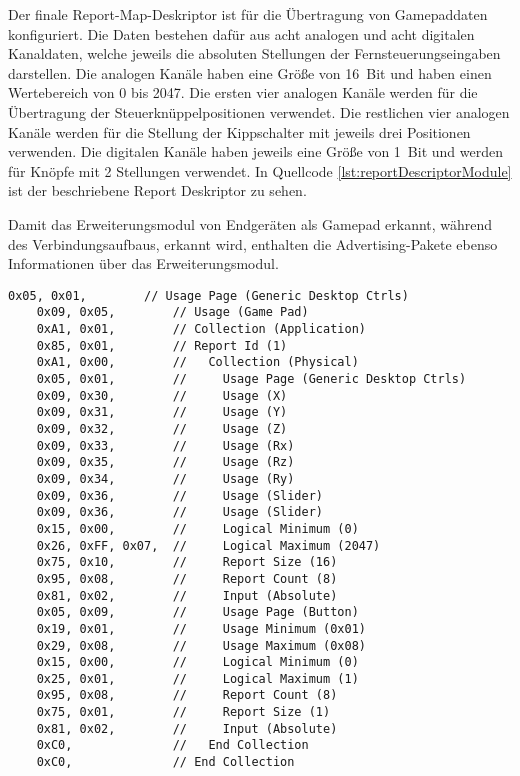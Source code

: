 Der finale Report-Map-Deskriptor ist für die Übertragung von Gamepaddaten konfiguriert. Die Daten bestehen dafür aus acht analogen und acht digitalen Kanaldaten, welche jeweils die absoluten Stellungen der Fernsteuerungseingaben darstellen. Die analogen Kanäle haben eine Größe von 16~Bit und haben einen Wertebereich von 0 bis 2047. Die ersten vier analogen Kanäle werden für die Übertragung der Steuerknüppelpositionen verwendet. Die restlichen vier analogen Kanäle werden für die Stellung der Kippschalter mit jeweils drei Positionen verwenden. Die digitalen Kanäle haben jeweils eine Größe von 1~Bit und werden für Knöpfe mit 2 Stellungen verwendet. In Quellcode \ref{lst:reportDescriptorModule} ist der beschriebene Report Deskriptor zu sehen.

Damit das Erweiterungsmodul von Endgeräten als Gamepad erkannt, während des Verbindungsaufbaus, erkannt wird, enthalten die Advertising-Pakete ebenso Informationen über das Erweiterungsmodul.

\begin{lstlisting}[caption=Report Map Deskriptor des Erweiterungsmoduls, label={lst:reportDescriptorModule}, style=generalStyle]
    0x05, 0x01,        // Usage Page (Generic Desktop Ctrls)
    0x09, 0x05,        // Usage (Game Pad)
    0xA1, 0x01,        // Collection (Application)
    0x85, 0x01,        // Report Id (1)
    0xA1, 0x00,        //   Collection (Physical)
    0x05, 0x01,        //     Usage Page (Generic Desktop Ctrls)
    0x09, 0x30,        //     Usage (X)
    0x09, 0x31,        //     Usage (Y)
    0x09, 0x32,        //     Usage (Z)
    0x09, 0x33,        //     Usage (Rx)
    0x09, 0x35,        //     Usage (Rz)
    0x09, 0x34,        //     Usage (Ry)
    0x09, 0x36,        //     Usage (Slider)
    0x09, 0x36,        //     Usage (Slider)
    0x15, 0x00,        //     Logical Minimum (0)
    0x26, 0xFF, 0x07,  //     Logical Maximum (2047)
    0x75, 0x10,        //     Report Size (16)
    0x95, 0x08,        //     Report Count (8)
    0x81, 0x02,        //     Input (Absolute)
    0x05, 0x09,        //     Usage Page (Button)
    0x19, 0x01,        //     Usage Minimum (0x01)
    0x29, 0x08,        //     Usage Maximum (0x08)
    0x15, 0x00,        //     Logical Minimum (0)
    0x25, 0x01,        //     Logical Maximum (1)
    0x95, 0x08,        //     Report Count (8)
    0x75, 0x01,        //     Report Size (1)
    0x81, 0x02,        //     Input (Absolute)
    0xC0,              //   End Collection
    0xC0,              // End Collection
\end{lstlisting}

